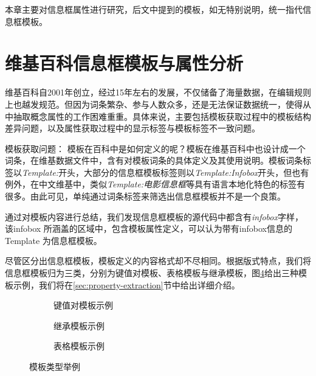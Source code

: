 本章主要对信息框属性进行研究，后文中提到的{\heiti 模板}，如无特别说明，统一指代{\heiti 信息框模板}。

\section{维基百科信息框模板与属性分析}
\label{sec:template-analysis}

维基百科自2001年创立，经过15年左右的发展，不仅储备了海量数据，在编辑规则上也越发规范。但因为词条繁杂、参与人数众多，还是无法保证数据统一，使得从中抽取概念属性的工作困难重重。具体来说，主要包括模板获取过程中的模板结构差异问题，以及属性获取过程中的显示标签与模板标签不一致问题。

{\heiti 模板获取问题：}
模板在百科中是如何定义的呢？模板在维基百科中也设计成一个词条，在维基数据文件中，含有对模板词条的具体定义及其使用说明。模板词条标签以\textit{Template:}开头，大部分的信息框模板标签则以\textit{Template:Infobox}开头，但也有例外，在中文维基中，类似\textit{Template:电影信息框}等具有语言本地化特色的标签有很多。由此可见，单纯通过词条标签来筛选出信息框模板并不是一个良策。

通过对模板内容进行总结，我们发现信息框模板的源代码中都含有\textit{infobox}字样，该infobox 所涵盖的区域中，包含模板属性定义，可以认为带有infobox信息的Template 为信息框模板。

尽管区分出信息框模板，模板定义的内容格式却不尽相同。根据版式特点，我们将信息框模板归为三类，分别为键值对模板、表格模板与继承模板，图\ref{fig:template-examples}给出三种模板示例，我们将在\ref{sec:property-extraction}节中给出详细介绍。

\begin{figure}[ht]
\centering
    \begin{subfigure}{7.2cm}
        \centering
        \caption{键值对模板示例}
        \label{fig:template-keyvalue}
    \end{subfigure}
    \hspace{0.02cm}
    \begin{subfigure}{7.2cm}
        \centering
        \caption{继承模板示例}
        \label{fig:template-inherit}
    \end{subfigure}
    \vspace{0.01cm}
    \begin{subfigure}{9.6cm}
        \centering
        \caption{表格模板示例}
        \label{fig:template-table}
    \end{subfigure}
\caption{模板类型举例}
\label{fig:template-examples}
\end{figure}

